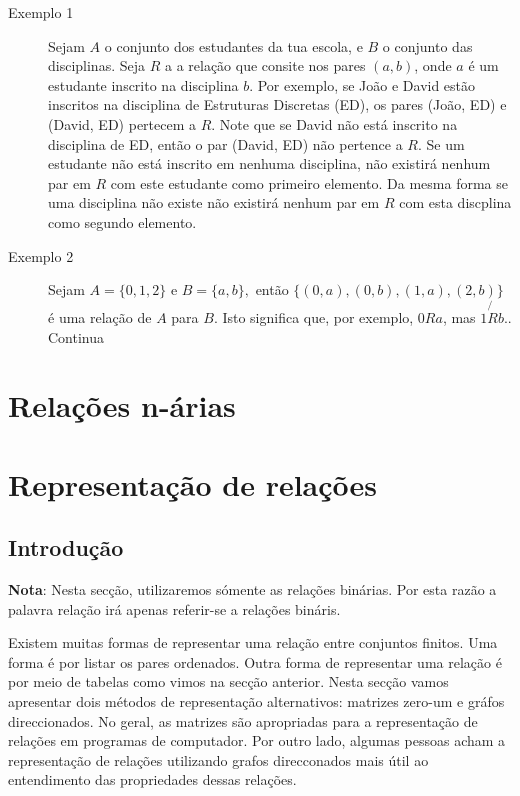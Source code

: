 \begin{description}
	\item[Exemplo 1] {Sejam $A$ o conjunto dos estudantes da tua escola, e $B$ o conjunto das disciplinas. Seja $R$ a 
	a relação que consite nos pares $(a,b)$, onde $a$ é um estudante inscrito na disciplina $b$. Por exemplo, se João e David
	estão inscritos na disciplina de Estruturas Discretas (ED), os pares (João, ED) e (David, ED) pertecem a $R$. Note que
	se David não está inscrito na disciplina de ED, então o par (David, ED) não pertence a $R$. Se um estudante
	não está inscrito em nenhuma disciplina, não existirá nenhum par em $R$ com este estudante como primeiro elemento. Da
	mesma forma se uma disciplina não existe não existirá nenhum par em $R$ com esta discplina como segundo elemento.}
\end{description}

\begin{description}
	\item[Exemplo 2] {Sejam  $A = \{0,1,2\}$ e $B = \{a,b\},$ então $\{(0,a), (0,b), (1,a), (2,b)\}$ é uma relação
	de $A$ para $B$. Isto significa que, por exemplo, $0 R a$, mas $1 \not{R} b$.}. Continua
\end{description}

\section{Relações n-árias}

\section{Representação de relações}

\subsection{Introdução}

\textbf{Nota}: Nesta secção, utilizaremos sómente as relações binárias. Por esta razão a palavra relação irá apenas referir-se a
relações bináris. 

Existem muitas formas de representar uma relação entre conjuntos finitos. Uma forma é por listar os pares ordenados.
Outra forma de representar uma relação é por meio de tabelas como vimos na secção anterior. Nesta secção vamos apresentar
dois métodos de representação alternativos: matrizes zero-um e gráfos direccionados. No geral, as matrizes são apropriadas
para a representação de relações em programas de computador. Por outro lado, algumas pessoas acham a representação
de relações utilizando grafos direcconados mais útil ao entendimento das propriedades dessas relações.

